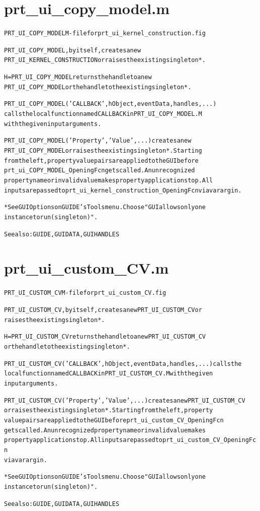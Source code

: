 \section{prt\_ui\_copy\_model.m}
\begin{alltt}

 PRT\_UI\_COPY\_MODEL M-file for prt\_ui\_kernel\_construction.fig
 
 PRT\_UI\_COPY\_MODEL, by itself, creates a new 
 PRT\_UI\_KERNEL\_CONSTRUCTION or raises the existing singleton*.
 
 H = PRT\_UI\_COPY\_MODEL returns the handle to a new 
 PRT\_UI\_COPY\_MODEL or the handle to the existing singleton*.
 
 PRT\_UI\_COPY\_MODEL('CALLBACK',hObject,eventData,handles,...)
 calls the local function named CALLBACK in PRT\_UI\_COPY\_MODEL.M 
 with the given input arguments.
 
 PRT\_UI\_COPY\_MODEL('Property','Value',...) creates a new 
 PRT\_UI\_COPY\_MODEL or raises the existing singleton*.  Starting 
 from the left, property value pairs are applied to the GUI before 
 prt\_ui\_COPY\_MODEL\_OpeningFcn gets called.  An unrecognized 
 property name or invalid value makes property application stop.  All 
 inputs are passed to prt\_ui\_kernel\_construction\_OpeningFcn via varargin.
 
 *See GUI Options on GUIDE's Tools menu.  Choose "GUI allows only one
 instance to run (singleton)".
 
 See also: GUIDE, GUIDATA, GUIHANDLES
\end{alltt}


\section{prt\_ui\_custom\_CV.m}
\begin{alltt}

 PRT\_UI\_CUSTOM\_CV M-file for prt\_ui\_custom\_CV.fig
 
 PRT\_UI\_CUSTOM\_CV, by itself, creates a new PRT\_UI\_CUSTOM\_CV or 
 raises the existing singleton*.
 
 H = PRT\_UI\_CUSTOM\_CV returns the handle to a new PRT\_UI\_CUSTOM\_CV 
 or the handle to the existing singleton*.
 
 PRT\_UI\_CUSTOM\_CV('CALLBACK',hObject,eventData,handles,...) calls the 
 local function named CALLBACK in PRT\_UI\_CUSTOM\_CV.M with the given 
 input arguments.
 
 PRT\_UI\_CUSTOM\_CV('Property','Value',...) creates a new PRT\_UI\_CUSTOM\_CV
 or raises the existing singleton*.  Starting from the left, property 
 value pairs are applied to the GUI before prt\_ui\_custom\_CV\_OpeningFcn 
 gets called.  An unrecognized property name or invalid value makes 
 property application stop.  All inputs are passed to prt\_ui\_custom\_CV\_OpeningFcn
 via varargin.
 
 *See GUI Options on GUIDE's Tools menu.  Choose "GUI allows only one
  instance to run (singleton)".
 
 See also: GUIDE, GUIDATA, GUIHANDLES
\end{alltt}


